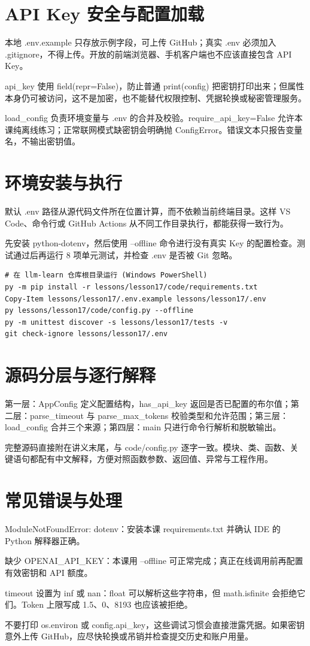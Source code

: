 \documentclass[UTF8,11pt,a4paper]{ctexart}
\begin{document}
\section{API Key 安全与配置加载}
本地 .env.example 只存放示例字段，可上传 GitHub；真实 .env 必须加入 .gitignore，不得上传。开放的前端浏览器、手机客户端也不应该直接包含 API Key。
\par
api\_key 使用 field(repr=False)，防止普通 print(config) 把密钥打印出来；但属性本身仍可被访问，这不是加密，也不能替代权限控制、凭据轮换或秘密管理服务。
\par
load\_config 负责环境变量与 .env 的合并及校验。require\_api\_key=False 允许本课纯离线练习；正常联网模式缺密钥会明确抛 ConfigError。错误文本只报告变量名，不输出密钥值。
\par
\section{环境安装与执行}
默认 .env 路径从源代码文件所在位置计算，而不依赖当前终端目录。这样 VS Code、命令行或 GitHub Actions 从不同工作目录执行，都能获得一致行为。
\par
先安装 python-dotenv，然后使用 --offline 命令进行没有真实 Key 的配置检查。测试通过后再运行 8 项单元测试，并检查 .env 是否被 Git 忽略。
\par
\begin{Verbatim}[fontsize=\footnotesize,breaklines=true,breakanywhere=true]
# 在 llm-learn 仓库根目录运行 (Windows PowerShell)
py -m pip install -r lessons/lesson17/code/requirements.txt
Copy-Item lessons/lesson17/.env.example lessons/lesson17/.env
py lessons/lesson17/code/config.py --offline
py -m unittest discover -s lessons/lesson17/tests -v
git check-ignore lessons/lesson17/.env
\end{Verbatim}
\section{源码分层与逐行解释}
第一层：AppConfig 定义配置结构，has\_api\_key 返回是否已配置的布尔值；第二层：parse\_timeout 与 parse\_max\_tokens 校验类型和允许范围；第三层：load\_config 合并三个来源；第四层：main 只进行命令行解析和脱敏输出。
\par
完整源码直接附在讲义末尾，与 code/config.py 逐字一致。模块、类、函数、关键语句都配有中文解释，方便对照函数参数、返回值、异常与工程作用。
\par
\section{常见错误与处理}
ModuleNotFoundError: dotenv：安装本课 requirements.txt 并确认 IDE 的 Python 解释器正确。
\par
缺少 OPENAI\_API\_KEY：本课用 --offline 可正常完成；真正在线调用前再配置有效密钥和 API 额度。
\par
timeout 设置为 inf 或 nan：float 可以解析这些字符串，但 math.isfinite 会拒绝它们。Token 上限写成 1.5、0、8193 也应该被拒绝。
\par
不要打印 os.environ 或 config.api\_key，这些调试习惯会直接泄露凭据。如果密钥意外上传 GitHub，应尽快轮换或吊销并检查提交历史和账户用量。
\par
\end{document}
